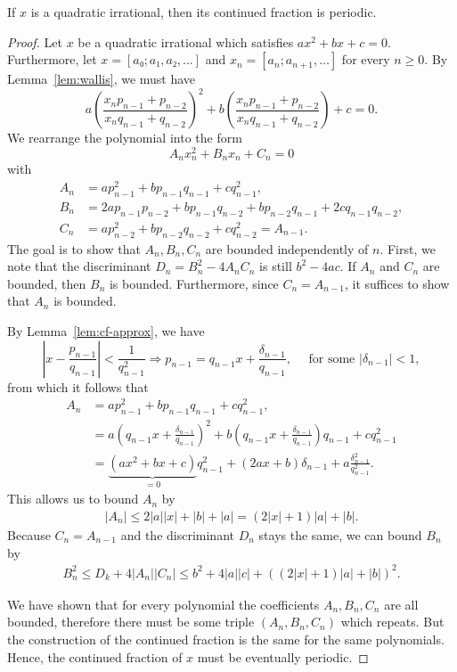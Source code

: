 \begin{theorem}
  If $x$ is a quadratic irrational,
  then its continued fraction is periodic.
\end{theorem}

\begin{proof}
  Let $x$ be a quadratic irrational which satisfies $ax^2 + bx + c = 0$.
  Furthermore, let $x = [a₀; a₁, a₂, …]$ and $x_n = [a_n; a_{n+1}, …]$ for every $n ≥ 0$.
  By Lemma~\ref{lem:wallis}, we must have
  \[
    a \left(\frac{x_n p_{n-1} + p_{n-2}}{x_n q_{n-1} + q_{n-2}}\right)^2
    + b \left(\frac{x_n p_{n-1} + p_{n-2}}{x_n q_{n-1} + q_{n-2}}\right)
    + c = 0.
  \]
  We rearrange the polynomial into the form
  \[
    A_n x_n^2 + B_n x_n + C_n = 0
  \]
  with
  \begin{align*}
    A_n & = a p_{n-1}^2 + b p_{n-1} q_{n-1} + c q_{n-1}^2, \\
    B_n & = 2a p_{n-1} p_{n-2} + b p_{n-1} q_{n-2} + b p_{n-2} q_{n-1} + 2c q_{n-1} q_{n-2}, \\
    C_n & = a p_{n-2}^2 + b p_{n-2} q_{n-2} + c q_{n-2}^2 = A_{n-1}.
  \end{align*}
  The goal is to show that $A_n, B_n, C_n$ are bounded independently of $n$.
  First, we note that the discriminant $D_n = B_n^2 - 4 A_n C_n$ is still $b^2 - 4ac$.
  If $A_n$ and $C_n$ are bounded, then $B_n$ is bounded.
  Furthermore, since $C_n = A_{n-1}$, it suffices to show that $A_n$ is bounded.

  By Lemma~\ref{lem:cf-approx}, we have
  \[
    \left| x - \frac{p_{n-1}}{q_{n-1}} \right| < \frac{1}{q_{n-1}^2}
    \Rightarrow
    p_{n-1} = q_{n-1} x + \frac{δ_{n-1}}{q_{n-1}}, \quad \text{ for some } |δ_{n-1}| < 1,
  \]
  from which it follows that
  \begin{align*}
    A_n & = a p_{n-1}^2 + b p_{n-1} q_{n-1} + c q_{n-1}^2, \\
    & = a \left( q_{n-1} x + \frac{δ_{n-1}}{q_{n-1}} \right)^2 + b \left( q_{n-1} x + \frac{δ_{n-1}}{q_{n-1}} \right) q_{n-1} + c q_{n-1}^2 \\
    & = \underbrace{(ax^2 + bx + c)}_{ = 0} q_{n-1}^2 + (2ax + b) δ_{n-1} + a \frac{δ_{n-1}^2}{q_{n-1}^2}.
  \end{align*}
  This allows us to bound $A_n$ by
  \begin{align*}
    |A_n| ≤ 2|a||x| + |b| + |a| = (2 |x| + 1) |a| + |b|.
  \end{align*}
  Because $C_n = A_{n-1}$ and the discriminant $D_n$ stays the same, we can
  bound $B_n$ by
  \begin{align*}
    B_n^2 ≤ D_k + 4 |A_n| |C_n| ≤ b^2 + 4 |a| |c| + ((2 |x| + 1)|a| + |b|)^2.
  \end{align*}

  We have shown that for every polynomial the coefficients $A_n, B_n, C_n$ are all bounded,
  therefore there must be some triple $(A_n, B_n, C_n)$ which repeats.
  But the construction of the continued fraction is the same for the same polynomials.
  Hence, the continued fraction of $x$ must be eventually periodic.
\end{proof}

